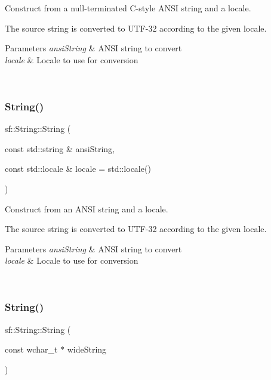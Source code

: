 Construct from a null-\/terminated C-\/style A\+N\+SI string and a locale. 

The source string is converted to U\+T\+F-\/32 according to the given locale.


\begin{DoxyParams}{Parameters}
{\em ansi\+String} & A\+N\+SI string to convert \\
\hline
{\em locale} & Locale to use for conversion \begin{DoxyVerb}\end{DoxyVerb}
 \\
\hline
\end{DoxyParams}
\mbox{\label{classsf_1_1_string_a0aa41dcbd17b0c36c74d03d3b0147f1e}} 
\subsubsection{\texorpdfstring{String()}{String()}\hspace{0.1cm}{\footnotesize\ttfamily [6/11]}}
{\footnotesize\ttfamily sf\+::\+String\+::\+String (\begin{DoxyParamCaption}\item[{const std\+::string \&}]{ansi\+String,  }\item[{const std\+::locale \&}]{locale = {\ttfamily std\+:\+:locale()} }\end{DoxyParamCaption})}



Construct from an A\+N\+SI string and a locale. 

The source string is converted to U\+T\+F-\/32 according to the given locale.


\begin{DoxyParams}{Parameters}
{\em ansi\+String} & A\+N\+SI string to convert \\
\hline
{\em locale} & Locale to use for conversion \begin{DoxyVerb}\end{DoxyVerb}
 \\
\hline
\end{DoxyParams}
\mbox{\label{classsf_1_1_string_a5742d0a9b0c754f711820c2b5c40fa55}} 
\subsubsection{\texorpdfstring{String()}{String()}\hspace{0.1cm}{\footnotesize\ttfamily [7/11]}}
{\footnotesize\ttfamily sf\+::\+String\+::\+String (\begin{DoxyParamCaption}\item[{const wchar\+\_\+t $\ast$}]{wide\+String }\end{DoxyParamCaption})}



